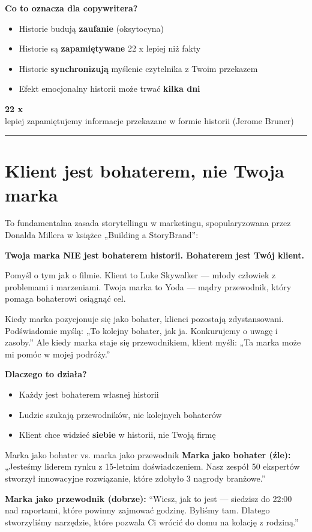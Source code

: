 \documentclass[
  12pt,
  a4paper,
  twoside,
  openright,
  12pt,
  DIV=12,
  BCOR=12mm]{scrbook}
\providecommand{\tightlist}{%
  \setlength{\itemsep}{0pt}\setlength{\parskip}{0pt}}\usepackage{longtable,booktabs,array}
\newcommand{\decoline}{%
  \begin{center}
    \textcolor{bordergray}{\rule{0.3\textwidth}{0.5pt}}
  \end{center}
}
\newcommand{\stathighlight}[2]{%
  \begin{center}
    \begin{tcolorbox}[
      enhanced,
      colback=primarylight,
      colframe=primaryblue,
      boxrule=1pt,
      arc=5pt,
      width=0.6\textwidth,
      halign=center
    ]
      {\fontsize{36}{40}\selectfont\bfseries\color{primarydark}#1}\\[5pt]
      {\color{textmuted}#2}
    \end{tcolorbox}
  \end{center}
}
\begin{document}
\textbf{Co to oznacza dla copywritera?}

\begin{itemize}
\tightlist
\item
  Historie budują \textbf{zaufanie} (oksytocyna)
\item
  Historie są \textbf{zapamiętywane} 22 x lepiej niż fakty
\item
  Historie \textbf{synchronizują} myślenie czytelnika z Twoim przekazem
\item
  Efekt emocjonalny historii może trwać \textbf{kilka dni}
\end{itemize}

\stathighlight{22 x}{lepiej zapamiętujemy informacje przekazane w formie historii (Jerome Bruner)}

\decoline

\section{Klient jest bohaterem, nie Twoja
marka}\label{klient-jest-bohaterem-nie-twoja-marka}

To fundamentalna zasada storytellingu w marketingu, spopularyzowana
przez Donalda Millera w książce „Building a StoryBrand'':

\textbf{Twoja marka NIE jest bohaterem historii. Bohaterem jest Twój
klient.}

Pomyśl o tym jak o filmie. Klient to Luke Skywalker --- młody człowiek z
problemami i marzeniami. Twoja marka to Yoda --- mądry przewodnik, który
pomaga bohaterowi osiągnąć cel.

\begin{wazne}
Kiedy marka pozycjonuje się jako bohater, klienci pozostają zdystansowani. Podświadomie myślą: „To kolejny bohater, jak ja. Konkurujemy o uwagę i zasoby.” Ale kiedy marka staje się przewodnikiem, klient myśli: „Ta marka może mi pomóc w mojej podróży.”
\end{wazne}

\textbf{Dlaczego to działa?}

\begin{itemize}
\tightlist
\item
  Każdy jest bohaterem własnej historii
\item
  Ludzie szukają przewodników, nie kolejnych bohaterów
\item
  Klient chce widzieć \textbf{siebie} w historii, nie Twoją firmę
\end{itemize}

\begin{przyklad}{Marka jako bohater vs. marka jako przewodnik}
\textbf{Marka jako bohater (źle):}
„Jesteśmy liderem rynku z 15-letnim doświadczeniem. Nasz zespół 50 ekspertów stworzył innowacyjne rozwiązanie, które zdobyło 3 nagrody branżowe.”

\textbf{Marka jako przewodnik (dobrze):}
``Wiesz, jak to jest --- siedzisz do 22:00 nad raportami, które powinny zajmować godzinę. Byliśmy tam. Dlatego stworzyliśmy narzędzie, które pozwala Ci wrócić do domu na kolację z rodziną.''
\end{przyklad}
\end{document}
